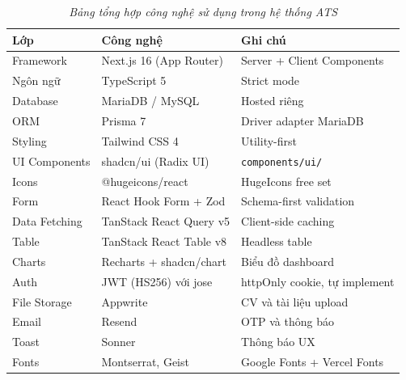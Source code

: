 \begin{table}[H]
    \centering
    \renewcommand{\arraystretch}{1.4}
    \begin{tabular}{|l|l|p{7cm}|}
        \hline
        \textbf{Lớp} & \textbf{Công nghệ} & \textbf{Ghi chú} \\ \hline
        Framework & Next.js 16 (App Router) & Server + Client Components \\ \hline
        Ngôn ngữ & TypeScript 5 & Strict mode \\ \hline
        Database & MariaDB / MySQL & Hosted riêng \\ \hline
        ORM & Prisma 7 & Driver adapter MariaDB \\ \hline
        Styling & Tailwind CSS 4 & Utility-first \\ \hline
        UI Components & shadcn/ui (Radix UI) & \texttt{components/ui/} \\ \hline
        Icons & @hugeicons/react & HugeIcons free set \\ \hline
        Form & React Hook Form + Zod & Schema-first validation \\ \hline
        Data Fetching & TanStack React Query v5 & Client-side caching \\ \hline
        Table & TanStack React Table v8 & Headless table \\ \hline
        Charts & Recharts + shadcn/chart & Biểu đồ dashboard \\ \hline
        Auth & JWT (HS256) với jose & httpOnly cookie, tự implement \\ \hline
        File Storage & Appwrite & CV và tài liệu upload \\ \hline
        Email & Resend & OTP và thông báo \\ \hline
        Toast & Sonner & Thông báo UX \\ \hline
        Fonts & Montserrat, Geist & Google Fonts + Vercel Fonts \\ \hline
    \end{tabular}
    \caption{\textit{Bảng tổng hợp công nghệ sử dụng trong hệ thống ATS}}
    \label{tab:tech_stack}
\end{table}

